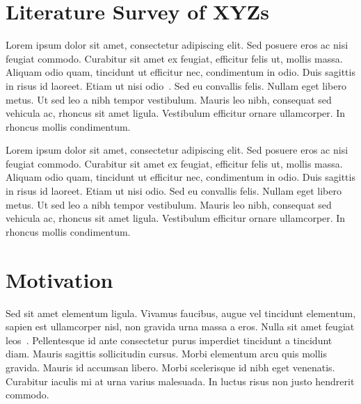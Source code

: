 
\section{Literature Survey of XYZs}
\label{sec:literature_survey}

Lorem ipsum dolor sit amet, consectetur adipiscing elit. Sed posuere eros ac nisi feugiat commodo. Curabitur sit amet ex feugiat, efficitur felis ut, mollis massa. Aliquam odio quam, tincidunt ut efficitur nec, condimentum in odio. Duis sagittis in risus id laoreet. Etiam ut nisi odio~\cite{Goguen1982aa}. Sed eu convallis felis. Nullam eget libero metus. Ut sed leo a nibh tempor vestibulum. Mauris leo nibh, consequat sed vehicula ac, rhoncus sit amet ligula. Vestibulum efficitur ornare ullamcorper. In rhoncus mollis condimentum. \newline

Lorem ipsum dolor sit amet, consectetur adipiscing elit. Sed posuere eros ac nisi feugiat commodo. Curabitur sit amet ex feugiat, efficitur felis ut, mollis massa. Aliquam odio quam, tincidunt ut efficitur nec, condimentum in odio. Duis sagittis in risus id laoreet. Etiam ut nisi odio. Sed eu convallis felis. Nullam eget libero metus. Ut sed leo a nibh tempor vestibulum. Mauris leo nibh, consequat sed vehicula ac, rhoncus sit amet ligula. Vestibulum efficitur ornare ullamcorper. In~\cite{Nagatou2006aa} rhoncus mollis condimentum. \newline


\section{Motivation}
\label{sec:motivation}

Sed sit amet elementum ligula. Vivamus faucibus, augue vel tincidunt elementum, sapien est ullamcorper nisl, non gravida urna massa a eros. Nulla sit amet feugiat leos~\cite{Gray2000aa}. Pellentesque id ante consectetur purus imperdiet tincidunt a tincidunt diam. Mauris sagittis sollicitudin cursus. Morbi elementum arcu quis mollis gravida. Mauris id accumsan libero. Morbi scelerisque id nibh eget venenatis. Curabitur iaculis mi at urna varius malesuada. In luctus risus non justo hendrerit commodo. \newline

